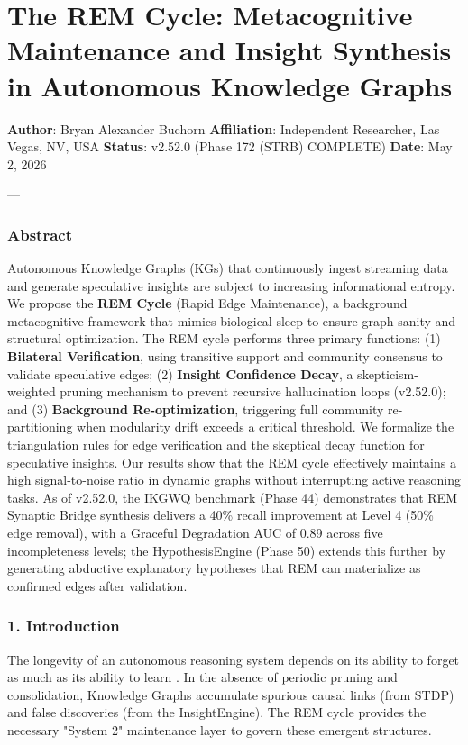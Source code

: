 \section{The REM Cycle: Metaco\-gnitive Maintenance and Insight Synthesis in Autonomous Knowledge Graphs}

\textbf{Author}: Bryan Alexander Buchorn  
\textbf{Affiliation}: Independent Researcher, Las Vegas, NV, USA  
\textbf{Status}: v2.52.0 (Phase 172 (STRB) COMPLETE)
\textbf{Date}: May 2, 2026

---

\subsubsection{Abstract}
Autonomous Knowledge Graphs (KGs) that conti\-nuously ingest streaming data and generate speculative insights are subject to increasing infor\-mational entropy. We propose the \textbf{REM Cycle} (Rapid Edge Maintenance), a background metac\-ognitive framework that mimics biological sleep to ensure graph sanity and structural optim\-ization. The REM cycle performs three primary functions: (1) \textbf{Bilateral Verifi\-cation}, using transitive support and community consensus to validate speculative edges; (2) \textbf{Insight Confidence Decay}, a skepticism-weighted pruning mechanism to prevent recursive hallu\-cination loops (v2.52.0); and (3) \textbf{Background Re-optim\-ization}, triggering full community re-parti\-tioning when modularity drift exceeds a critical threshold. We formalize the trian\-gulation rules for edge verif\-ication and the skeptical decay function for speculative insights. Our results show that the REM cycle effectively maintains a high signal-to-noise ratio in dynamic graphs without inter\-rupting active reasoning tasks. As of v2.52.0, the IKGWQ benchmark (Phase 44) demon\-strates that REM Synaptic Bridge synthesis delivers a 40\% recall improvement at Level 4 (50\% edge removal), with a Graceful Degradation AUC of 0.89 across five incom\-pleteness levels; the HypothesisEngine (Phase 50) extends this further by generating abductive explanatory hypotheses that REM can materialize as confirmed edges after validation.

\subsubsection{1. Introd\-uction}
The longevity of an autonomous reasoning system depends on its ability to forget as much as its ability to learn \cite{diekelmann2010memory}. In the absence of periodic pruning and conso\-lidation, Knowledge Graphs accumulate spurious causal links (from STDP) and false discoveries (from the InsightEngine). The REM cycle provides the necessary "System 2" maintenance layer to govern these emergent structures.

